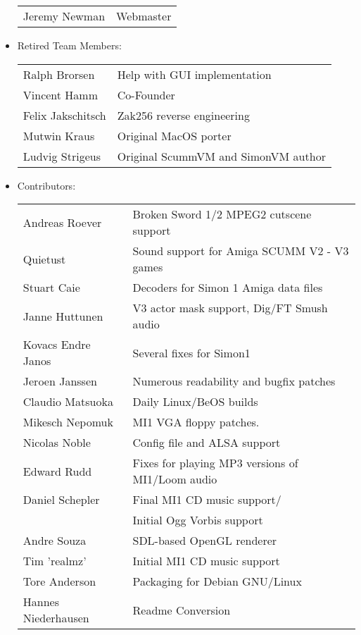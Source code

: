 \begin{itemize}
\begin{tabular}[h]{ll}
    Jeremy Newman        & Webmaster\\
  \end{tabular}
\item Retired Team Members:\\
  \begin{tabular}[h]{ll}
    Ralph Brorsen        & Help with GUI implementation\\
    Vincent Hamm         & Co-Founder\\
    Felix Jakschitsch    & Zak256 reverse engineering\\
    Mutwin Kraus         & Original MacOS porter\\
    Ludvig Strigeus      & Original ScummVM and SimonVM author\\
  \end{tabular}
\item Contributors:\\
  \begin{tabular}{ll}
    Andreas Roever       & Broken Sword 1/2 MPEG2 cutscene support\\
    Quietust             & Sound support for Amiga SCUMM V2 - V3 games\\
    Stuart Caie          & Decoders for Simon 1 Amiga data files\\
    Janne Huttunen       & V3 actor mask support, Dig/FT Smush audio\\
    Kovacs Endre Janos   & Several fixes for Simon1\\
    Jeroen Janssen       & Numerous readability and bugfix patches\\
    Claudio Matsuoka     & Daily Linux/BeOS builds \\
    Mikesch Nepomuk      & MI1 VGA floppy patches.\\
    Nicolas Noble        & Config file and ALSA support\\
    Edward Rudd          & Fixes for playing MP3 versions of MI1/Loom audio\\
    Daniel Schepler      & Final MI1 CD music support/\\
                         & Initial Ogg Vorbis support\\
    Andre Souza          & SDL-based OpenGL renderer\\
    Tim 'realmz'         & Initial MI1 CD music support\\
    Tore Anderson        & Packaging for Debian GNU/Linux\\
    Hannes Niederhausen  & Readme Conversion\\
  \end{tabular}
  

\end{itemize}
